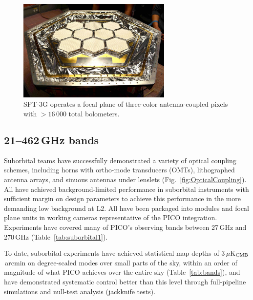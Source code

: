 
\begin{figure}[b]
\parbox{3.5in}{\centering
\includegraphics[width=3in]{figures/SPT3G.jpg} }
\parbox{3.0in}{
\caption{\captiontext 
  SPT-3G operates a focal plane of three-color antenna-coupled pixels with $>16\,000$ total bolometers.\label{fig:spt_fp}} }
\end{figure}


\subsection{21--462\,GHz bands}
\label{sec:bolometers} %

Suborbital teams have successfully demonstrated a variety of optical
coupling schemes, including horns with ortho-mode transducers (OMTs),
lithographed antenna arrays, and sinuous antennas under lenslets
(Fig.~\ref{fig:OpticalCoupling}). All have achieved background-limited
performance in suborbital instruments with sufficient margin on design
parameters to achieve this performance in the more demanding low
background at L2. All have been packaged into modules and focal plane
units in working cameras representative of the PICO integration.
Experiments have covered many of PICO's observing bands between
27\,GHz and 270\,GHz (Table~\ref{tab:suborbital1}). 


\costfootnote



To date, suborbital experiments have achieved statistical map depths
of 3\,$\mu$K$_{\rm CMB}$\,arcmin on degree-scaled modes over small
parts of the sky, within an order of magnitude of what PICO achieves over the entire
sky (Table~\ref{tab:bands}), and have demonstrated systematic control
better than this level through full-pipeline simulations and null-test analysis
(jackknife tests). 

